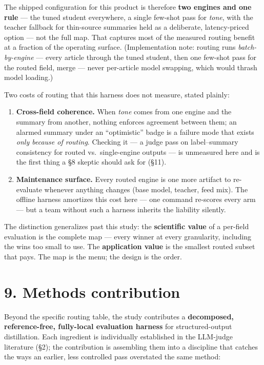 \documentclass[11pt]{article}
\providecommand{\tightlist}{\setlength{\itemsep}{0pt}\setlength{\parskip}{0pt}}
\providecommand{\tightlist}{%
  \setlength{\itemsep}{0pt}\setlength{\parskip}{0pt}}
\begin{document}
The shipped configuration for this product is therefore \textbf{two
engines and one rule} --- the tuned student everywhere, a single
few-shot pass for \emph{tone}, with the teacher fallback for thin-source
summaries held as a deliberate, latency-priced option --- not the full
map. That captures most of the measured routing benefit at a fraction of
the operating surface. (Implementation note: routing runs
\emph{batch-by-engine} --- every article through the tuned student, then
one few-shot pass for the routed field, merge --- never per-article
model swapping, which would thrash model loading.)

Two costs of routing that this harness does not measure, stated plainly:

\begin{enumerate}
\def\labelenumi{\arabic{enumi}.}
\tightlist
\item
  \textbf{Cross-field coherence.} When \emph{tone} comes from one engine
  and the summary from another, nothing enforces agreement between them;
  an alarmed summary under an ``optimistic'' badge is a failure mode
  that exists \emph{only because of routing}. Checking it --- a judge
  pass on label--summary consistency for routed vs.~single-engine
  outputs --- is unmeasured here and is the first thing a §8 skeptic
  should ask for (§11).
\item
  \textbf{Maintenance surface.} Every routed engine is one more artifact
  to re-evaluate whenever anything changes (base model, teacher, feed
  mix). The offline harness amortizes this cost here --- one command
  re-scores every arm --- but a team without such a harness inherits the
  liability silently.
\end{enumerate}

The distinction generalizes past this study: the \textbf{scientific
value} of a per-field evaluation is the complete map --- every winner at
every granularity, including the wins too small to use. The
\textbf{application value} is the smallest routed subset that pays. The
map is the menu; the design is the order.

\section{9. Methods contribution}\label{methods-contribution}

Beyond the specific routing table, the study contributes a
\textbf{decomposed, reference-free, fully-local evaluation harness} for
structured-output distillation. Each ingredient is individually
established in the LLM-judge literature (§2); the contribution is
assembling them into a discipline that catches the ways an earlier, less
controlled pass overstated the same method:
\end{document}
